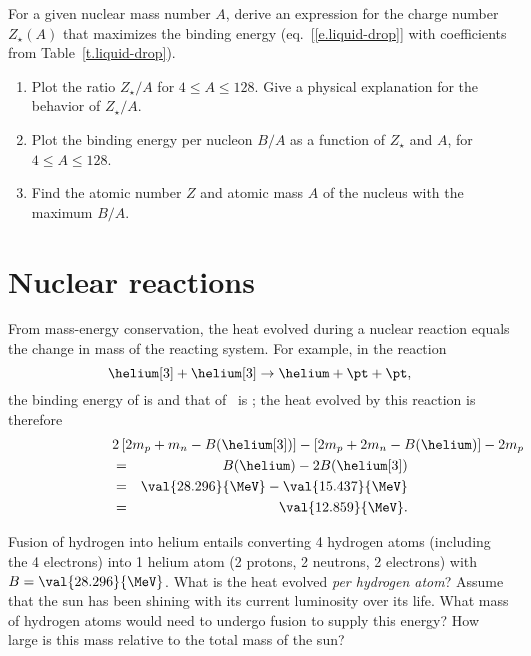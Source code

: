 \begin{exercisebox}
\label{ex.nuclear-landscape}
For a given nuclear mass number $A$, derive an expression for the charge number $Z_{\star}(A)$ that maximizes the binding energy (eq.~[\ref{e.liquid-drop}] with coefficients from Table~\ref{t.liquid-drop}).
\begin{enumerate}
\item Plot the ratio $Z_{\star}/A$ for $4\le A\le 128$. Give a physical explanation for the behavior of $Z_{\star}/A$.
\item Plot the binding energy per nucleon $B/A$ as a function of $Z_{\star}$ and $A$, for $4\le A\le 128$.
\item Find the atomic number $Z$ and atomic mass $A$ of the nucleus with the maximum $B/A$.
\end{enumerate}
\end{exercisebox}

\section{Nuclear reactions}

From mass-energy conservation, the heat evolved during a nuclear reaction equals the change in mass of the reacting system. For example, in the reaction
\[
	\helium[3] + \helium[3] \to \helium + \pt + \pt,
\]
the binding energy of \helium[3] is  and that of \helium\ is ; the heat evolved by this reaction is therefore
\begin{eqnarray*}
	\lefteqn{2\left[2m_{p}+m_{n}-B(\helium[3])\right] - \left[2m_{p}+2m_{n}-B(\helium)\right] - 2m_{p}} \\
	&=& B(\helium)-2B(\helium[3])\\
	&=& \val{28.296}{\MeV} - \val{15.437}{\MeV}\\ &=& \val{12.859}{\MeV}.
\end{eqnarray*}

\begin{exercisebox}
\label{ex.Q-hydrogen-helium}
Fusion of hydrogen into helium entails converting 4 hydrogen atoms (including the 4 electrons) into 1 helium atom (2 protons, 2 neutrons, 2 electrons) with $B = \val{28.296}{\MeV}$. What is the heat evolved \emph{per hydrogen atom}? Assume that the sun has been shining with its current luminosity over its life. What mass of hydrogen atoms would need to undergo fusion to supply this energy? How large is this mass relative to the total mass of the sun? 
\end{exercisebox}

